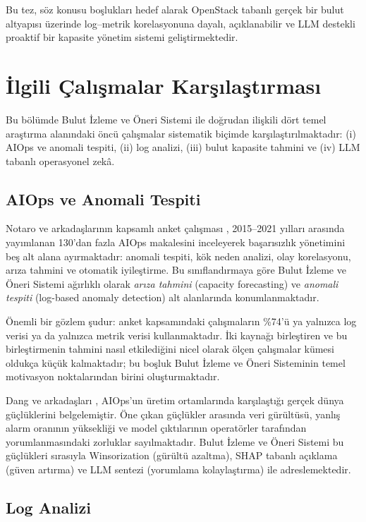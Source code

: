 Bu tez, söz konusu boşlukları hedef alarak OpenStack tabanlı gerçek bir bulut altyapısı üzerinde log--metrik korelasyonuna dayalı, açıklanabilir ve LLM destekli proaktif bir kapasite yönetim sistemi geliştirmektedir.


\section{İlgili Çalışmalar Karşılaştırması}
\label{sec:ilgiliçalışmalar}

Bu bölümde Bulut İzleme ve Öneri Sistemi ile doğrudan ilişkili dört temel araştırma alanındaki öncü çalışmalar sistematik biçimde karşılaştırılmaktadır: (i) AIOps ve anomali tespiti, (ii) log analizi, (iii) bulut kapasite tahmini ve (iv) LLM tabanlı operasyonel zekâ.

\subsection{AIOps ve Anomali Tespiti}

Notaro ve arkadaşlarının kapsamlı anket çalışması \autocite{notaro2021}, 2015--2021 yılları arasında yayımlanan 130'dan fazla AIOps makalesini inceleyerek başarısızlık yönetimini beş alt alana ayırmaktadır: anomali tespiti, kök neden analizi, olay korelasyonu, arıza tahmini ve otomatik iyileştirme.
Bu sınıflandırmaya göre Bulut İzleme ve Öneri Sistemi ağırlıklı olarak \textit{arıza tahmini} (capacity forecasting) ve \textit{anomali tespiti} (log-based anomaly detection) alt alanlarında konumlanmaktadır.

Önemli bir gözlem şudur: anket kapsamındaki çalışmaların \%74'ü ya yalnızca log verisi ya da yalnızca metrik verisi kullanmaktadır.
İki kaynağı birleştiren ve bu birleştirmenin tahmini nasıl etkilediğini nicel olarak ölçen çalışmalar kümesi oldukça küçük kalmaktadır; bu boşluk Bulut İzleme ve Öneri Sisteminin temel motivasyon noktalarından birini oluşturmaktadır.

Dang ve arkadaşları \autocite{dang2019}, AIOps'un üretim ortamlarında karşılaştığı gerçek dünya güçlüklerini belgelemiştir.
Öne çıkan güçlükler arasında veri gürültüsü, yanlış alarm oranının yüksekliği ve model çıktılarının operatörler tarafından yorumlanmasındaki zorluklar sayılmaktadır.
Bulut İzleme ve Öneri Sistemi bu güçlükleri sırasıyla Winsorization (gürültü azaltma), SHAP tabanlı açıklama (güven artırma) ve LLM sentezi (yorumlama kolaylaştırma) ile adreslemektedir.

\subsection{Log Analizi}

